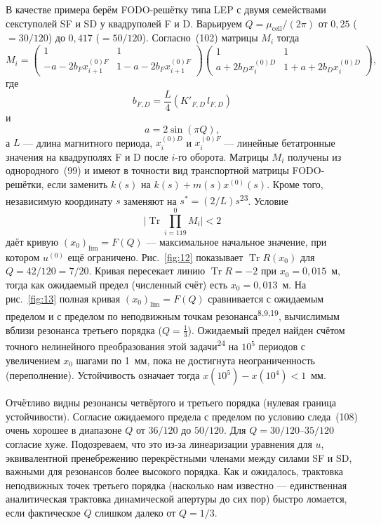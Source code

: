 \documentclass[11pt,a4paper]{article}
\DeclareMathOperator{\Tr}{Tr}
\begin{document}
В качестве примера берём FODO-решётку типа LEP с двумя семействами секступолей
SF и SD у квадруполей F и D. Варьируем $Q=\mu_{\mathrm{cell}}/(2\pi)$ от
$0{,}25$ ($=30/120$) до $0{,}417$ ($=50/120$). Согласно~(102) матрицы $M_i$ тогда
\begin{equation}
M_i=
\begin{pmatrix}
1 & 1 \\
-a-2b_F x_{i+1}^{(0)F} & 1-a-2b_F x_{i+1}^{(0)F}
\end{pmatrix}
\begin{pmatrix}
1 & 1 \\
a+2b_D x_i^{(0)D} & 1+a+2b_D x_i^{(0)D}
\end{pmatrix},
\end{equation}
где
\begin{equation}
b_{F,D}=\frac{L}{4}(K'_{F,D}\,l_{F,D})
\end{equation}
и
\begin{equation}
a=2\sin(\pi Q),
\end{equation}
а $L$ --- длина магнитного периода, $x_i^{(0)D}$ и $x_i^{(0)F}$ --- линейные
бетатронные значения на квадруполях F и D после $i$-го оборота. Матрицы $M_i$
получены из однородного~(99) и имеют в точности вид транспортной матрицы
FODO-решётки, если заменить $k(s)$ на $k(s)+m(s)x^{(0)}(s)$. Кроме того,
независимую координату $s$ заменяют на $s^*=(2/L)s$\textsuperscript{23}. Условие
\begin{equation}
\Biggl|\Tr\prod_{i=119}^{0} M_i\Biggr|<2
\end{equation}
даёт кривую $(x_0)_{\mathrm{lim}}=F(Q)$ --- максимальное начальное значение, при
котором $u^{(0)}$ ещё ограничено. Рис.~\ref{fig:12} показывает $\Tr R(x_0)$ для
$Q=42/120=7/20$. Кривая пересекает линию $\Tr R=-2$ при $x_0=0{,}015$~м, тогда
как ожидаемый предел (численный счёт) есть $x_0=0{,}013$~м. На рис.~\ref{fig:13}
полная кривая $(x_0)_{\mathrm{lim}}=F(Q)$ сравнивается с ожидаемым пределом и с
пределом по неподвижным точкам резонанса\textsuperscript{8,9,19}, вычислимым
вблизи резонанса третьего порядка ($Q=\tfrac13$). Ожидаемый предел найден счётом
точного нелинейного преобразования этой задачи\textsuperscript{24} на $10^5$
периодов с увеличением $x_0$ шагами по 1~мм, пока не достигнута неограниченность
(переполнение). Устойчивость означает тогда $x(10^5)-x(10^4)<1$~мм.

Отчётливо видны резонансы четвёртого и третьего порядка (нулевая граница
устойчивости). Согласие ожидаемого предела с пределом по условию следа~(108)
очень хорошее в диапазоне $Q$ от $36/120$ до $50/120$. Для
$Q=30/120$--$35/120$ согласие хуже. Подозреваем, что это из-за линеаризации
уравнения для $u$, эквивалентной пренебрежению перекрёстными членами между силами
SF и SD, важными для резонансов более высокого порядка. Как и ожидалось,
трактовка неподвижных точек третьего порядка (насколько нам известно ---
единственная аналитическая трактовка динамической апертуры до сих пор) быстро
ломается, если фактическое $Q$ слишком далеко от $Q=1/3$.
\end{document}
